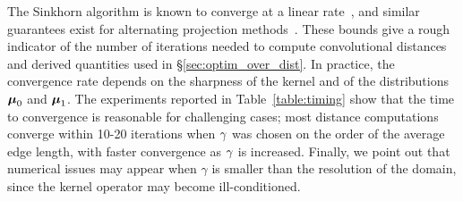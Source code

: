 The Sinkhorn algorithm is known to converge at a linear rate~\cite{franklin-1989,knight-2008}, and similar guarantees exist for alternating projection methods~\cite{escalante-2011}. These bounds give a rough indicator of the number of iterations needed to compute convolutional distances and derived quantities used in \S\ref{sec:optim_over_dist}. 
In practice, the convergence rate depends on the sharpness of the kernel and of the distributions $\boldsymbol{\mu}_0$ and $\boldsymbol{\mu}_1$.  The experiments reported in Table~\ref{table:timing} show that the time to convergence is reasonable for challenging cases; most distance computations converge within 10-20 iterations when $\gamma$ was chosen on the order of the average edge length, with faster convergence as $\gamma$ is increased.  
Finally, we point out that numerical issues may appear when $\gamma$ is smaller than the resolution of the domain, since the kernel operator may become ill-conditioned.

